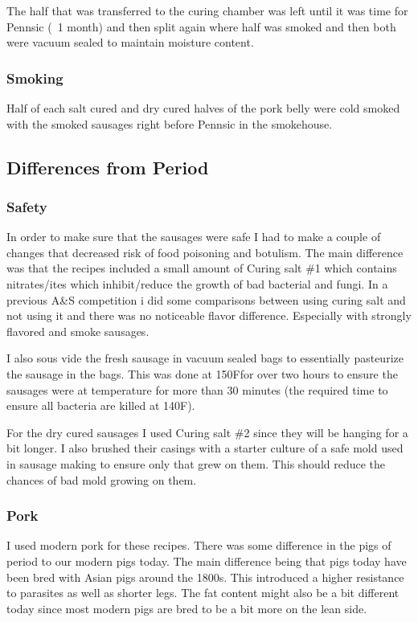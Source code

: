 \documentclass[letterpaper,11pt,leqno]{article}
\begin{document}
The half that was transferred to the curing chamber was left until it was time for Pennsic (~1 month) and then split again where half was smoked and then both were vacuum sealed to maintain moisture content.

\subsubsection{Smoking}

Half of each salt cured and dry cured halves of the pork belly were cold smoked with the smoked sausages right before Pennsic in the smokehouse.

\subsection{Differences from Period}

\subsubsection{Safety} In order to make sure that the sausages were safe I had to make a couple of changes that decreased risk of food poisoning and botulism. The main difference was that the recipes included a small amount of Curing salt \#1 which contains nitrates/ites which inhibit/reduce the growth of bad bacterial and fungi. In a previous A\&S competition i did some comparisons between using curing salt and not using it and there was no noticeable flavor difference. Especially with strongly flavored and smoke sausages. 

I also sous vide the fresh sausage in vacuum sealed bags to essentially pasteurize the sausage in the bags. This was done at 150F\textdegree for over two hours to ensure the sausages were at temperature for more than 30 minutes (the required time to ensure all bacteria are killed at 140F\textdegree).

For the dry cured sausages I used Curing salt \#2 since they will be hanging for a bit longer. I also brushed their casings with a starter culture of a safe mold used in sausage making to ensure only that grew on them. This should reduce the chances of bad mold growing on them.

\subsubsection{Pork} I used modern pork for these recipes. There was some difference in the pigs of period to our modern pigs today. The main difference being that pigs today have been bred with Asian pigs around the 1800s. This introduced a higher resistance to parasites as well as shorter legs. The fat content might also be a bit different today since most modern pigs are bred to be a bit more on the lean side.
\end{document}
